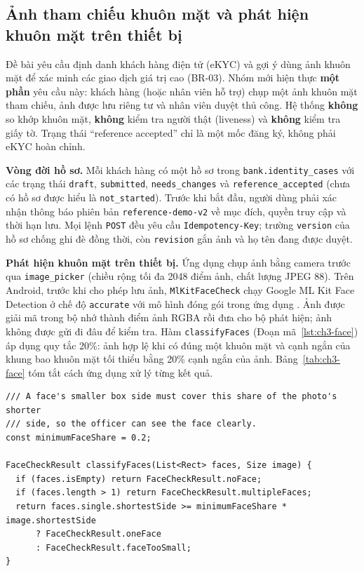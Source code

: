 \subsection{Ảnh tham chiếu khuôn mặt và phát hiện khuôn mặt trên thiết bị}
\label{sec:ch3-reference}

Đề bài yêu cầu định danh khách hàng điện tử (eKYC) và gợi ý dùng ảnh khuôn mặt để xác minh các giao dịch giá trị cao (BR-03). Nhóm mới hiện thực \textbf{một phần} yêu cầu này: khách hàng (hoặc nhân viên hỗ trợ) chụp một ảnh khuôn mặt tham chiếu, ảnh được lưu riêng tư và nhân viên duyệt thủ công. Hệ thống \textbf{không} so khớp khuôn mặt, \textbf{không} kiểm tra người thật (liveness) và \textbf{không} kiểm tra giấy tờ. Trạng thái ``reference accepted'' chỉ là một mốc đăng ký, không phải eKYC hoàn chỉnh.

\textbf{Vòng đời hồ sơ.} Mỗi khách hàng có một hồ sơ trong \texttt{bank.\allowbreak{}identity\_\allowbreak{}cases} với các trạng thái \texttt{draft}, \texttt{submitted}, \texttt{needs\_\allowbreak{}changes} và \texttt{reference\_\allowbreak{}accepted} (chưa có hồ sơ được hiểu là \texttt{not\_\allowbreak{}started}). Trước khi bắt đầu, người dùng phải xác nhận thông báo phiên bản \texttt{reference-\allowbreak{}demo-\allowbreak{}v2} về mục đích, quyền truy cập và thời hạn lưu. Mọi lệnh \texttt{POST} đều yêu cầu \texttt{Idempotency-\allowbreak{}Key}; trường \texttt{version} của hồ sơ chống ghi đè đồng thời, còn \texttt{revision} gắn ảnh và họ tên đang được duyệt.

\textbf{Phát hiện khuôn mặt trên thiết bị.} Ứng dụng chụp ảnh bằng camera trước qua \texttt{image\_\allowbreak{}picker} (chiều rộng tối đa 2048 điểm ảnh, chất lượng JPEG 88). Trên Android, trước khi cho phép lưu ảnh, \texttt{Ml\allowbreak{}Kit\allowbreak{}Face\allowbreak{}Check} chạy Google ML Kit Face Detection ở chế độ \texttt{accurate} với mô hình đóng gói trong ứng dụng \parencite{ch2-mlkit-face}. Ảnh được giải mã trong bộ nhớ thành điểm ảnh RGBA rồi đưa cho bộ phát hiện; ảnh không được gửi đi đâu để kiểm tra. Hàm \texttt{classifyFaces} (Đoạn mã~\ref{lst:ch3-face}) áp dụng quy tắc 20\%: ảnh hợp lệ khi có đúng một khuôn mặt và cạnh ngắn của khung bao khuôn mặt tối thiểu bằng 20\% cạnh ngắn của ảnh. Bảng~\ref{tab:ch3-face} tóm tắt cách ứng dụng xử lý từng kết quả.

\begin{lstlisting}[caption={Quy tắc phân loại kết quả phát hiện khuôn mặt (\texttt{app/\allowbreak{}lib/\allowbreak{}data/\allowbreak{}face\_\allowbreak{}check.\allowbreak{}dart})},label={lst:ch3-face}]
/// A face's smaller box side must cover this share of the photo's shorter
/// side, so the officer can see the face clearly.
const minimumFaceShare = 0.2;

FaceCheckResult classifyFaces(List<Rect> faces, Size image) {
  if (faces.isEmpty) return FaceCheckResult.noFace;
  if (faces.length > 1) return FaceCheckResult.multipleFaces;
  return faces.single.shortestSide >= minimumFaceShare * image.shortestSide
      ? FaceCheckResult.oneFace
      : FaceCheckResult.faceTooSmall;
}
\end{lstlisting}

